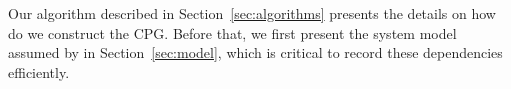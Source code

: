 %
%




Our algorithm described in Section~\ref{sec:algorithms} presents the details on how do we construct the CPG. Before that,  we first present the system model assumed by \projecttitle in Section~\ref{sec:model}, which is critical to record these dependencies efficiently.














 